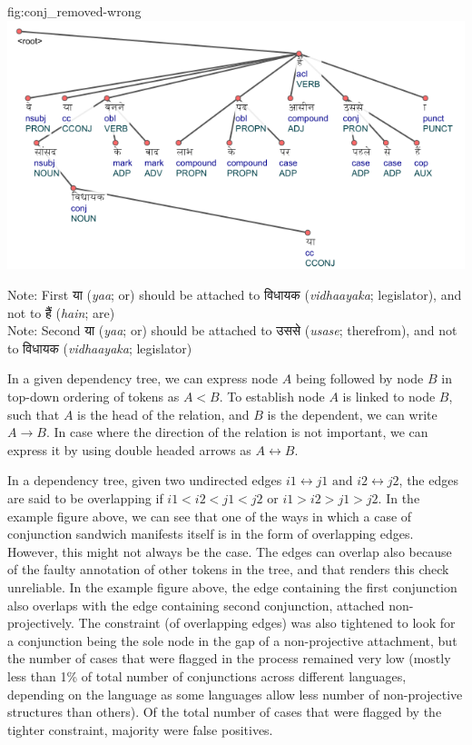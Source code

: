 \begin{reusefigure}[H]{fig:conj_removed-wrong}
    \centering
    \includegraphics[scale=0.85]{img/removed-conj-wrong.png}
    \caption{Original Annotation for Example \ref{examp:conj_removed}}
    Note: First \texthindi{या} (\textit{yaa}; or) should be attached to \texthindi{विधायक} (\textit{vidhaayaka}; legislator), and not to \texthindi{हैं} (\textit{hain}; are)\\
  Note: Second \texthindi{या} (\textit{yaa}; or) should be attached to \texthindi{उससे} (\textit{usase}; therefrom), and not to \texthindi{विधायक} (\textit{vidhaayaka}; legislator)
\end{reusefigure}

In a given dependency tree, we can express node \(A\) being followed by node \(B\) in top-down ordering of tokens as \(A < B\). To establish node \(A\) is linked to node \(B\), such that \(A\) is the head of the relation, and \(B\) is the dependent, we can write \(A \rightarrow B\). In case where the direction of the relation is not important, we can express it by using double headed arrows as \(A \leftrightarrow B\). 

In a dependency tree, given two undirected edges \(i1 \leftrightarrow j1 \text{ and } i2 \leftrightarrow j2\), the edges are said to be overlapping if \(i1 < i2 < j1 < j2\) or \(i1 > i2 > j1 > j2\). In the example figure above, we can see that one of the ways in which a case of conjunction sandwich manifests itself is in the form of overlapping edges. However, this might not always be the case. The edges can overlap also because of the faulty annotation of other tokens in the tree, and that renders this check unreliable. In the example figure above, the edge containing the first conjunction also overlaps with the edge containing second conjunction, attached non-projectively. The constraint (of overlapping edges) was also tightened to look for a conjunction being the sole node in the gap of a non-projective attachment, but the number of cases that were flagged in the process remained very low (mostly less than 1\% of total number of conjunctions across different languages, depending on the language as some languages allow less number of non-projective structures than others). Of the total number of cases that were flagged by the tighter constraint, majority were false positives.

